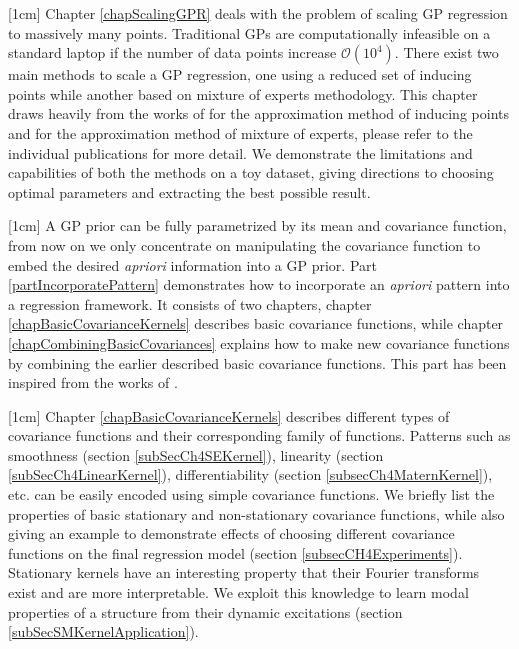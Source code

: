 [1cm]
Chapter \ref{chapScalingGPR} deals with the problem of scaling GP regression to massively many points. Traditional GPs are computationally infeasible on a standard laptop if the number of data points increase $\mathcal{O}(10^4)$. There exist two main methods to scale a GP regression, one using a reduced set of inducing points while another based on mixture of experts methodology. This chapter draws heavily from the works of \cite{quinonero2005unifying, seeger2003fast, Snelson06sparsegaussian, Titsias09variationallearning} for the approximation method of inducing points and \cite{cao2014generalized, tresp2000bayesian, chen2009bagging, deisenroth2015distributed} for the approximation method of mixture of experts, please refer to the individual publications for more detail. We demonstrate the limitations and capabilities of both the methods on a toy dataset, giving directions to choosing optimal parameters and extracting the best possible result.  

[1cm]
A GP prior can be fully parametrized by its mean and covariance function, from now on we only concentrate on manipulating the covariance function to embed the desired \textit{apriori} information into a GP prior. Part \ref{partIncorporatePattern} demonstrates how to incorporate an \textit{apriori} pattern into a regression framework. It consists of two chapters, chapter \ref{chapBasicCovarianceKernels} describes basic covariance functions, while chapter \ref{chapCombiningBasicCovariances} explains how to make new covariance functions by combining the earlier described basic covariance functions. This part has been inspired from the works of \cite{bishop2006pattern, mackay2003information, duvenaud-thesis-2014, wilson2014thesis, lloyd2014automatic, durrande2001etude, durrande2013anova}. 

[1cm]
Chapter \ref{chapBasicCovarianceKernels} describes different types of covariance functions and their corresponding family of functions. Patterns such as smoothness (section \ref{subSecCh4SEKernel}), linearity (section \ref{subSecCh4LinearKernel}), differentiability (section \ref{subsecCh4MaternKernel}), etc. can be easily encoded using simple covariance functions. We briefly list the properties of basic stationary and non-stationary covariance functions, while also giving an example to demonstrate effects of choosing different covariance functions on the final regression model (section \ref{subsecCH4Experiments}). Stationary kernels have an interesting property that their Fourier transforms exist and are more interpretable. We exploit this knowledge to learn modal properties of a structure from their dynamic excitations (section \ref{subSecSMKernelApplication}). 

